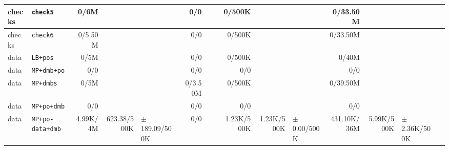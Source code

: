 \begin{tabular}{l l  | r r l | r r l | r r l | r r l l}
          checks &                                              \verb|check5| &           0/6M &                       &                   &            0/0 &                       &                 &         0/500K &                       &                   &       0/33.50M &                       &                   & \\ \hline 
          checks &                                              \verb|check6| &        0/5.50M &                       &                   &            0/0 &                       &                 &         0/500K &                       &                   &       0/33.50M &                       &                   & \\ \hline 
            data &                                              \verb|LB+pos| &           0/5M &                       &                   &            0/0 &                       &                 &         0/500K &                       &                   &          0/40M &                       &                   & \\ \hline 
            data &                                           \verb|MP+dmb+po| &            0/0 &                       &                   &            0/0 &                       &                 &            0/0 &                       &                   &            0/0 &                       &                   & \\ \hline 
            data &                                             \verb|MP+dmbs| &           0/5M &                       &                   &        0/3.50M &                       &                 &         0/500K &                       &                   &       0/39.50M &                       &                   & \\ \hline 
            data &                                           \verb|MP+po+dmb| &            0/0 &                       &                   &            0/0 &                       &                 &            0/0 &                       &                   &            0/0 &                       &                   & \\ \hline 
            data &                                      \verb|MP+po-data+dmb| &       4.99K/4M &           623.38/500K & $\pm$ 189.09/500K &            0/0 &                       &                 &     1.23K/500K &            1.23K/500K &   $\pm$ 0.00/500K &    431.10K/36M &            5.99K/500K &  $\pm$ 2.36K/500K & \\ \hline 

\end{tabular}
